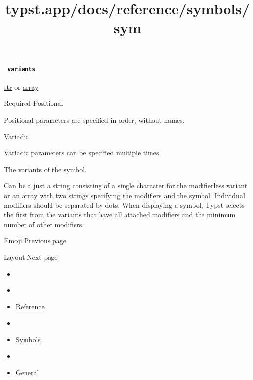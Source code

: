 \paragraph{\texorpdfstring{\texttt{\ variants\ }}{ variants }}\label{constructor-variants}

\href{/docs/reference/foundations/str/}{str} {or}
\href{/docs/reference/foundations/array/}{array}

{Required} {{ Positional }}

\label{constructor-variants-positional-tooltip}
Positional parameters are specified in order, without names.

{{ Variadic }}

\label{constructor-variants-variadic-tooltip}
Variadic parameters can be specified multiple times.

The variants of the symbol.

Can be a just a string consisting of a single character for the
modifierless variant or an array with two strings specifying the
modifiers and the symbol. Individual modifiers should be separated by
dots. When displaying a symbol, Typst selects the first from the
variants that have all attached modifiers and the minimum number of
other modifiers.

\href{/docs/reference/symbols/emoji/}{\pandocbounded{}}

{ Emoji } { Previous page }

\href{/docs/reference/layout/}{\pandocbounded{}}

{ Layout } { Next page }


\title{typst.app/docs/reference/symbols/sym}

\begin{itemize}
\tightlist
\item
  \href{/docs}{}
\item
  
\item
  \href{/docs/reference/}{Reference}
\item
  
\item
  \href{/docs/reference/symbols/}{Symbols}
\item
  
\item
  \href{/docs/reference/symbols/sym/}{General}
\end{itemize}


